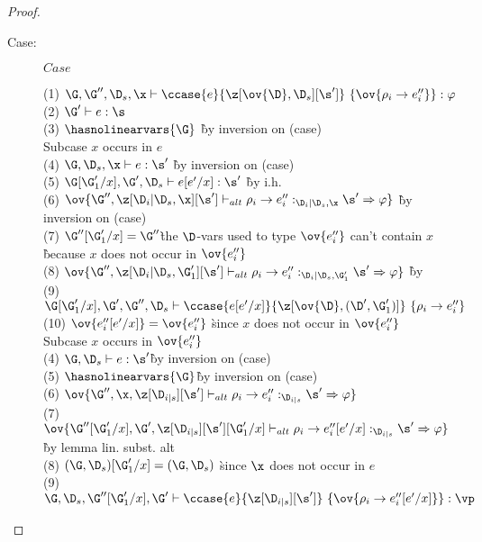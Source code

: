 \begin{proof}
\begin{description}
\item[Case:] $Case$
\begin{tabbing}
    (1) $\G, \G'', \D_s, \x \vdash \ccase{e}{\z[\ov{\D},\D_s][\s']}~\{\ov{\rho_i
    \to e''_i}\} : \varphi$\\
    (2) $\G' \vdash e : \s$\\
    (3) $\hasnolinearvars{\G}$ \` by inversion on (case)\\
    Subcase $x$ occurs in $e$\\
    (4) $\G, \D_s, \x \vdash e : \s'$ \` by inversion on (case)\\
    (5) $\G[\G'_1/x],\G',\D_s \vdash e[e'/x] : \s'$ \` by i.h.\\
    (6) $\ov{\G'',\z[\D_i|\D_s,\x][\s'] \vdash_{alt} \rho_i \to e''_i :_{\D_i|\D_s,\x} \s' \Rightarrow \varphi}$ \` by inversion on (case)\\
    (7) $\G''[\G'_1/x]=\G''$\` the $\D$-vars used to type $\ov{e''_i}$ can't contain $x$\\
                            \` because $x$ does not occur in $\ov{e''_i}$\\
    (8) $\ov{\G'',\z[\D_i|\D_s,\G'_1][\s'] \vdash_{alt} \rho_i \to e''_i :_{\D_i|\D_s,\G'_1} \s' \Rightarrow \varphi}$ \` by \\
    (9) $\G[\G'_1/x],\G',\G'',\D_s \vdash \ccase{e[e'/x]}{\z[\ov{\D},(\D',\G'_1)]}~\{\rho_i \to e''_i\}$\\
    (10) $\ov{e''_i[e'/x]} = \ov{e''_i}$ \` since $x$ does not occur in $\ov{e''_i}$\\
    Subcase $x$ occurs in $\ov{e''_i}$\\
    (4) $\G,\D_s \vdash e : \s'$\` by inversion on (case)\\
    (5) $\hasnolinearvars{\G}$\` by inversion on (case)\\
    (6) $\ov{\G'',\x,\z[\D_{i|s}][\s'] \vdash_{alt} \rho_i \to e''_i :_{\D_{i|s}} \s' \Rightarrow \varphi}$\\
    (7) $\ov{\G''[\G'_1/x],\G',\z[\D_{i|s}][\s'][\G'_1/x] \vdash_{alt} \rho_i \to e''_i[e'/x] :_{\D_{i|s}} \s' \Rightarrow \varphi}$\\\` by lemma lin. subst. alt\\
    (8) $(\G,\D_s)[\G'_1/x] = (\G,\D_s)$ \` since $\x$ does not occur in $e$\\
    (9) $\G,\D_s,\G''[\G'_1/x],\G' \vdash \ccase{e}{\z[\D_{i|s}][\s']}~\{\ov{\rho_i \to e''_i[e'/x]}\} : \vp$\\
\end{tabbing}
\end{description}
\end{proof}

